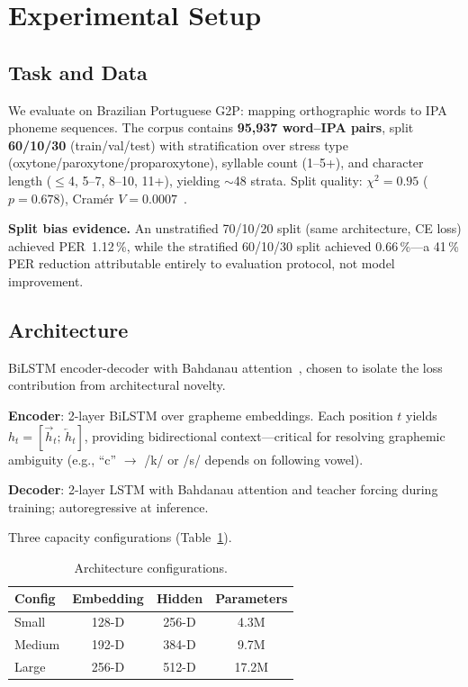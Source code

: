 \documentclass[conference]{IEEEtran}
\begin{document}
\section{Experimental Setup}
\label{sec:eval}

\subsection{Task and Data}

We evaluate on Brazilian Portuguese G2P: mapping orthographic words
to IPA phoneme sequences.
The corpus contains \textbf{95{,}937 word--IPA pairs}, split
\textbf{60/10/30} (train/val/test) with stratification over stress
type (oxytone/paroxytone/proparoxytone), syllable count (1--5+),
and character length ($\leq$4, 5--7, 8--10, 11+), yielding
$\sim$48 strata.
Split quality: $\chi^2\!=\!0.95$ ($p\!=\!0.678$),
Cram\'{e}r $V\!=\!0.0007$~\cite{kohavi1995crossvalidation}.

\textbf{Split bias evidence.}
An unstratified 70/10/20 split (same architecture, CE loss) achieved
PER~1.12\,\%, while the stratified 60/10/30 split achieved
0.66\,\%---a 41\,\% PER reduction attributable entirely to
evaluation protocol, not model improvement.

\subsection{Architecture}

BiLSTM encoder-decoder with Bahdanau
attention~\cite{bahdanau2014neural}, chosen to isolate the loss
contribution from architectural novelty.

\textbf{Encoder}: 2-layer BiLSTM over grapheme embeddings.
Each position $t$ yields
$h_t\!=\![\overrightarrow{h}_t;\,\overleftarrow{h}_t]$,
providing bidirectional context---critical for resolving graphemic
ambiguity (e.g., ``c'' $\to$ /k/ or /s/ depends on following vowel).

\textbf{Decoder}: 2-layer LSTM with Bahdanau attention and teacher
forcing during training; autoregressive at inference.

Three capacity configurations (Table~\ref{tab:configs}).

\begin{table}[ht]
  \caption{Architecture configurations.}
  \label{tab:configs}
  \centering\small
  \begin{tabular}{lccc}
    \toprule
    Config  & Embedding & Hidden & Parameters \\
    \midrule
    Small   & 128-D & 256-D & 4.3M \\
    Medium  & 192-D & 384-D & 9.7M \\
    Large   & 256-D & 512-D & 17.2M \\
    \bottomrule
  \end{tabular}
\end{table}
\end{document}
